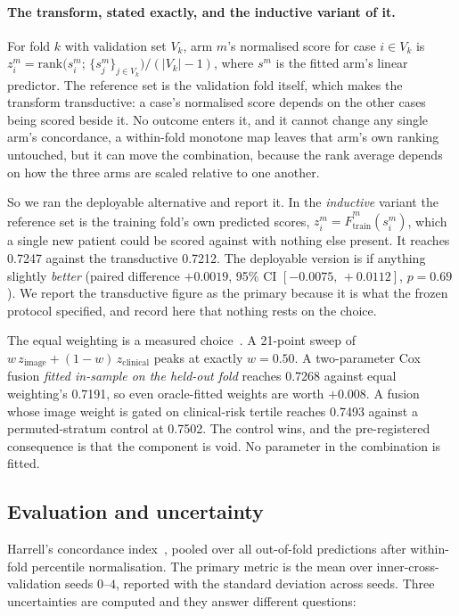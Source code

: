 \paragraph{The transform, stated exactly, and the inductive variant of it.} For fold $k$ with
validation set $V_k$, arm $m$'s normalised score for case $i \in V_k$ is
$z^{m}_{i} = \mathrm{rank}\big(s^{m}_{i};\, \{s^{m}_{j}\}_{j \in V_k}\big) / (|V_k| - 1)$, where
$s^{m}$ is the fitted arm's linear predictor. The reference set is the validation fold
itself, which makes the transform transductive: a case's normalised score depends on the other
cases being scored beside it. No outcome enters it, and it cannot change any single arm's
concordance, a within-fold monotone map leaves that arm's own ranking untouched, but it can
move the combination, because the rank average depends on how the three arms are scaled relative to
one another.

So we ran the deployable alternative and report it. In the \emph{inductive} variant the reference
set is the training fold's own predicted scores, $z^{m}_{i} = \hat{F}^{m}_{\text{train}}(s^{m}_{i})$,
which a single new patient could be scored against with nothing else present. It reaches
0.7247 against the transductive 0.7212. The deployable version is if anything slightly
\emph{better} (paired difference $+0.0019$, 95\% CI $[-0.0075,\,+0.0112]$, $p=0.69$). We report the
transductive figure as the primary because it is what the frozen protocol specified, and record
here that nothing rests on the choice.

The equal weighting is a measured choice~\citep{bates1969combination}. A 21-point sweep of
$w\,z_{\text{image}} + (1-w)\,z_{\text{clinical}}$ peaks at exactly $w=0.50$. A two-parameter Cox
fusion \emph{fitted in-sample on the held-out fold} reaches 0.7268 against equal weighting's 0.7191,
so even oracle-fitted weights are worth $+0.008$. A fusion whose image weight is gated on
clinical-risk tertile reaches 0.7493 against a permuted-stratum control at 0.7502. The control
wins, and the pre-registered consequence is that the component is void. No parameter in the
combination is fitted.

\subsection*{Evaluation and uncertainty}

Harrell's concordance index~\citep{harrell1982cindex}, pooled over all out-of-fold predictions after
within-fold percentile normalisation. The primary metric is the mean over inner-cross-validation
seeds $0$--$4$, reported with the standard deviation across seeds. Three uncertainties are computed
and they answer different questions:

